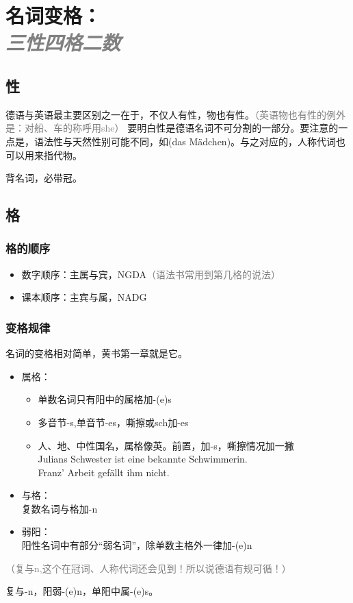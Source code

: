 \chapter{名词变格：\\\Large\itshape\textcolor{gray}{三性四格二数}}
\label{chap:noun}
\section{性}
德语与英语最主要区别之一在于，不仅人有性，物也有性。\textcolor{gray}{（英语物也有性的例外是：对船、车的称呼用she）}
要明白性是德语名词不可分割的一部分。要注意的一点是，语法性与天然性别可能不同，如(das Mädchen)。与之对应的，人称代词也可以用来指代物。 \label{sec:noun:gender} \\
\begin{myquote}
    背名词，必带冠。
\end{myquote}

\section{格}
\subsection{格的顺序}
\begin{itemize}
    \item 数字顺序：主属与宾，NGDA\textcolor{gray}{（语法书常用到第几格的说法）}
    \item 课本顺序：主宾与属，NADG
\end{itemize}
\subsection{变格规律}
\label{subsec:noun:declension}
名词的变格相对简单，黄书第一章就是它。
\begin{itemize}
    \item 属格： \\
          \begin{itemize}
              \item 单数名词只有阳中的属格加-(e)s
              \item 多音节-s,单音节-es，嘶擦或sch加-es
              \item 人、地、中性国名，属格像英。前置，加-s，嘶擦情况加一撇 \\
                    Julians Schwester ist eine bekannte Schwimmerin. \\
                    Franz' Arbeit gefällt ihm nicht.
          \end{itemize}
    \item 与格： \\
          复数名词与格加-n
    \item 弱阳：\\
          阳性名词中有部分“弱名词”，除单数主格外一律加-(e)n
\end{itemize}
\textcolor{gray}{（复与n,这个在冠词、人称代词还会见到！所以说德语有规可循！）}
\begin{myquote}
    复与-n，阳弱-(e)n，单阳中属-(e)s。
\end{myquote}


